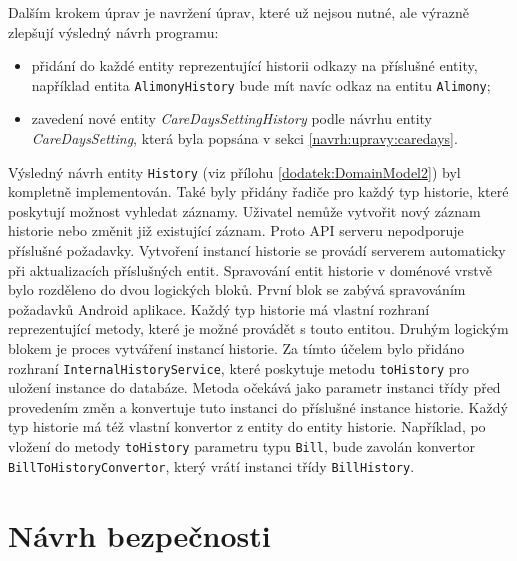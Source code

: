         Dalším krokem úprav je navržení úprav, které už nejsou nutné, ale výrazně zlepšují výsledný návrh programu:
        \begin{itemize}
            \item přidání do každé entity reprezentující historii odkazy na příslušné entity, například entita \texttt{AlimonyHistory} bude mít navíc odkaz na entitu \texttt{Alimony};
            \item zavedení nové entity \textit{CareDaysSettingHistory} podle návrhu entity \textit{CareDaysSetting}, která byla popsána v sekci \ref{navrh:upravy:caredays}.
        \end{itemize}
        Výsledný návrh entity \verb|History| (viz přílohu \ref{dodatek:DomainModel2}) byl kompletně implementován. Také byly přidány řadiče pro každý typ historie, které poskytují možnost vyhledat záznamy. Uživatel nemůže vytvořit nový záznam historie nebo změnit již existující záznam. Proto API serveru nepodporuje příslušné požadavky. Vytvoření instancí historie se provádí serverem automaticky při aktualizacích příslušných entit.
        Spravování entit historie v doménové vrstvě bylo rozděleno do dvou logických bloků. První blok se zabývá spravováním požadavků Android aplikace. Každý typ historie má vlastní rozhraní reprezentující metody, které je možné provádět s touto entitou. Druhým logickým blokem je proces vytváření instancí historie. Za tímto účelem bylo přidáno rozhraní \verb|InternalHistoryService|, které poskytuje metodu \verb|toHistory| pro uložení instance do databáze.
        Metoda očekává jako parametr instanci třídy před provedením změn a konvertuje tuto instanci do příslušné instance historie. Každý typ historie má též vlastní konvertor z entity do entity historie. Například, po vložení do metody \verb|toHistory| parametru typu \verb|Bill|, bude zavolán konvertor \verb|BillToHistoryConvertor|, který vrátí instanci třídy \verb|BillHistory|. 

\section{Návrh bezpečnosti}\label{navrh:bezpecnost}
